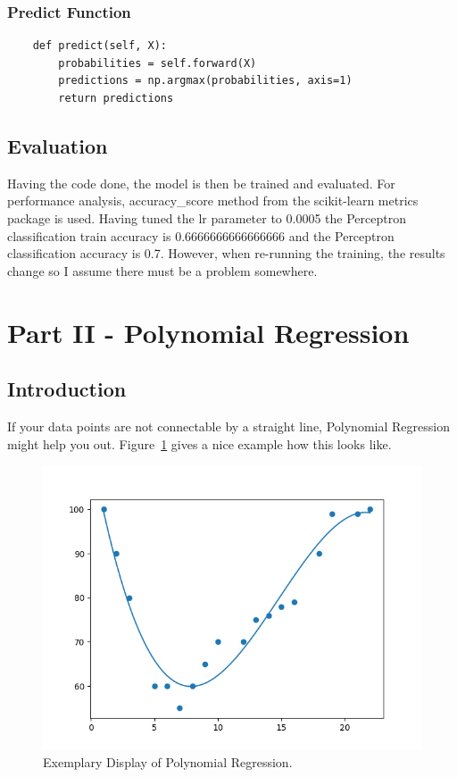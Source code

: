 \documentclass{CPSReport}
\begin{document}
\subsubsection{Predict Function}
\begin{verbatim}
    def predict(self, X):
        probabilities = self.forward(X)
        predictions = np.argmax(probabilities, axis=1)
        return predictions
\end{verbatim}

\subsection{Evaluation}
Having the code done, the model is then be trained and evaluated. For performance analysis, accuracy\_score method from the scikit-learn metrics package is used. Having tuned the lr parameter to 0.0005 the Perceptron classification train accuracy is 0.6666666666666666 and the Perceptron classification accuracy is 0.7. However, when re-running the training, the results change so I assume there must be a problem somewhere.

\FloatBarrier
\section{Part II - Polynomial Regression}
\subsection{Introduction}
If your data points are not connectable by a straight line, Polynomial Regression might help you out. Figure~\ref{fig:example_poly} gives a nice example how this looks like.
\begin{figure}[ht]
    \centering
    \includegraphics[width=0.9\linewidth]{pics/polynomial_regression_example.png}
    \caption{Exemplary Display of Polynomial Regression.}
    \label{fig:example_poly}
\end{figure}
\end{document}
